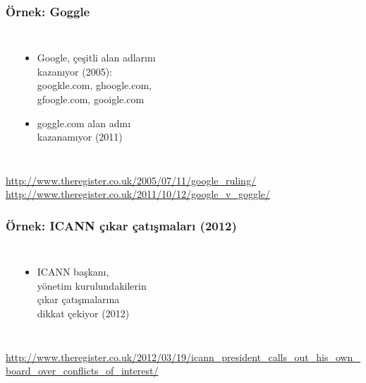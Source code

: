 \documentclass[dvipsnames]{beamer}
\theoremstyle{definition}
\theoremstyle{example}
\theoremstyle{plain}
\begin{document}
\begin{frame}
  \frametitle{Örnek: Goggle}

  \begin{columns}
    \begin{center}
    \end{center}

    \begin{itemize}
      \item Google, çeşitli alan adlarını\\
        kazanıyor (2005):\\
        googkle.com, ghoogle.com,\\
        gfoogle.com, gooigle.com
      \item goggle.com alan adını\\
        kazanamıyor (2011)
    \end{itemize}
  \end{columns}

  \medskip
  \tiny{\url{http://www.theregister.co.uk/2005/07/11/google_ruling/}}\\
  \tiny{\url{http://www.theregister.co.uk/2011/10/12/google_v_goggle/}}\\
\end{frame}

\begin{frame}
  \frametitle{Örnek: ICANN çıkar çatışmaları (2012)}

  \begin{columns}
    \begin{center}
    \end{center}

    \begin{itemize}
      \item ICANN başkanı,\\
        yönetim kurulundakilerin\\
        çıkar çatışmalarına\\
        dikkat çekiyor (2012)
    \end{itemize}
  \end{columns}

  \medskip
  \tiny{\url{http://www.theregister.co.uk/2012/03/19/icann_president_calls_out_his_own_board_over_conflicts_of_interest/}}\\
\end{frame}
\end{document}
